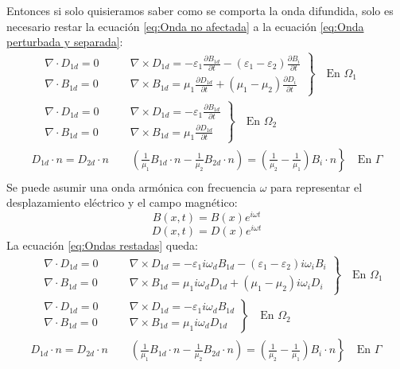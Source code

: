 Entonces si solo quisieramos saber como se comporta la onda difundida, solo es necesario restar la ecuación \eqref{eq:Onda no afectada} a la ecuación \eqref{eq:Onda perturbada y separada}:
\begin{equation}
\label{eq:Ondas restadas}
\begin{split}
\left.
\begin{aligned}
&\nabla\cdot D_{1d}= 0\qquad & \nabla\times D_{1d}= -\varepsilon_1\frac{\partial B_{1d}}{\partial t}-(\varepsilon_1-\varepsilon	_2)\frac{\partial B_i}{\partial t}\\
&\nabla\cdot B_{1d} = 0\qquad &  \nabla\times B_{1d}= \mu_1\frac{\partial D_{1d}}{\partial t}+(\mu_1-\mu_2)\frac{\partial D_i}{\partial t}
\end{aligned}
\right\}
\quad\text{En }\Omega_1\\
\left.
\begin{aligned}
&\nabla\cdot D_{1d}= 0\qquad & \nabla\times D_{1d}= -\varepsilon_1\frac{\partial B_{1d}}{\partial t}\\
&\nabla\cdot B_{1d} = 0\qquad &  \nabla\times B_{1d}= \mu_1\frac{\partial D_{1d}}{\partial t}
\end{aligned}
\right\}
\quad\text{En }\Omega_2\\
\left. 
D_{1d}\cdot n=D_{2d}\cdot n \qquad \left(\frac{1}{\mu_1}B_{1d}\cdot n-\frac{1}{\mu_2}B_{2d}\cdot n\right)=\left(\frac{1}{\mu_2}-\frac{1}{\mu_1}\right)B_i\cdot n
\right\}
\quad\text{En }\Gamma\\
\end{split}
\end{equation}
Se puede asumir una onda armónica con frecuencia $\omega$ para representar el desplazamiento eléctrico y el campo magnético:
$$B(x,t)=B(x)e^{i\omega t}$$
$$D(x,t)=D(x)e^{i\omega t}$$
La ecuación \eqref{eq:Ondas restadas} queda:
\begin{equation}
\label{eq:Ondas armonicas restadas }
\begin{split}
\left.
\begin{aligned}
&\nabla\cdot D_{1d}= 0\qquad & \nabla\times D_{1d}= -\varepsilon_1i\omega_d B_{1d}-(\varepsilon_1-\varepsilon	_2) i\omega_i B_i\\
&\nabla\cdot B_{1d} = 0\qquad &  \nabla\times B_{1d}= \mu_1 i\omega_d D_{1d}+(\mu_1-\mu_2)i\omega_i D_i
\end{aligned}
\right\}
\quad\text{En }\Omega_1\\
\left.
\begin{aligned}
&\nabla\cdot D_{1d}= 0\qquad & \nabla\times D_{1d}= -\varepsilon_1 i\omega_d B_{1d}\\
&\nabla\cdot B_{1d} = 0\qquad &  \nabla\times B_{1d}= \mu_1 i\omega_d D_{1d}
\end{aligned}
\right\}
\quad\text{En }\Omega_2\\
\left. 
D_{1d}\cdot n=D_{2d}\cdot n \qquad \left(\frac{1}{\mu_1}B_{1d}\cdot n-\frac{1}{\mu_2}B_{2d}\cdot n\right)=\left(\frac{1}{\mu_2}-\frac{1}{\mu_1}\right)B_i\cdot n
\right\}
\quad\text{En }\Gamma\\
\end{split}
\end{equation}
